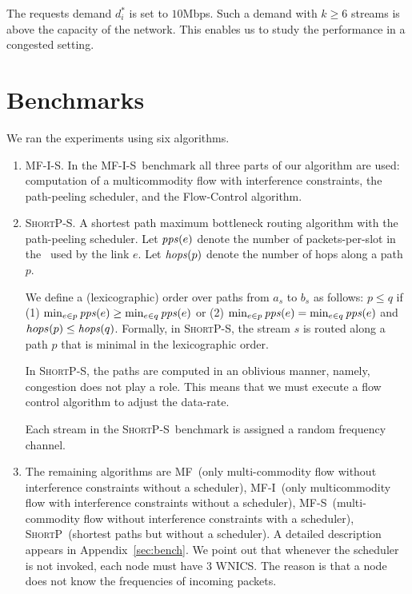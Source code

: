 \documentclass[12pt,oneside,english,a4paper]{book}
\theoremstyle{plain}
\theoremstyle{definition}
\theoremstyle{Theorem}
\theoremstyle{plain}
\newenvironment{proof sketch}[1]{\noindent {\emph{Proof sketch of #1:}}}{\hfill \qed}
\newcommand{\pps}{\text{\emph{pps}}}
\newcommand{\hops}{\text{\emph{hops}}}
\newcommand{\MCS}{\text{\sc{mcs}}}
\newcommand{\algA}{\textsc{MF-I-S}}
\newcommand{\algB}{\textsc{ShortP}}
\newcommand{\algBS}{\textsc{ShortP-S}}
\newcommand{\algC}{\textsc{MF-I}}
\newcommand{\algD}{\textsc{MF}}
\newcommand{\algE}{\textsc{MF-S}}
\begin{document}
The requests demand $d^*_i$ is set to $10$Mbps. Such a demand with
$k\geq 6$ streams is above the capacity of the network. This enables
us to study the performance in a congested setting.


\section{Benchmarks}
We ran the experiments using six algorithms.
\begin{enumerate}
\item \algA. In the \algA\ benchmark all three parts of our algorithm
  are used: computation of a multicommodity flow with interference
  constraints, the path-peeling scheduler, and the Flow-Control
  algorithm.

\item \algBS. A shortest path maximum bottleneck routing algorithm
  with the path-peeling scheduler.  Let $\pps(e)$ denote the number of
  packets-per-slot in the \MCS\ used by the link $e$.  Let $\hops(p)$
  denote the number of hops along a path $p$.

  We define a (lexicographic) order over paths from $a_s$ to $b_s$ as
  follows: $p \leq q$ if (1) $\min_{e\in p} \pps(e) \geq \min_{e\in q}
  \pps(e)$ or (2) $\min_{e \in p} \pps(e) = \min_{e \in q} \pps(e)$
  and $hops(p) \leq \hops(q)$.  Formally, in \algBS, the stream $s$ is
  routed along a path $p$ that is minimal in the lexicographic order.

  In \algBS, the paths are computed in an oblivious manner, namely,
  congestion does not play a role. This means that we must execute a
  flow control algorithm to adjust the data-rate.

  Each stream in the \algBS\ benchmark is assigned a random
  frequency channel.
\item The remaining algorithms are \algD\ (only multi-commodity flow
  without interference constraints without a scheduler), \algC\ (only
  multicommodity flow with interference constraints without a
  scheduler), \algE\ (multi-commodity flow without interference
  constraints with a scheduler), \algB\ (shortest paths but without a
  scheduler).  A detailed description appears in
  Appendix~\ref{sec:bench}. We point out that whenever the scheduler
  is not invoked, each node must have $3$ WNICS. The reason is that a
  node does not know the frequencies of incoming packets.
\end{enumerate}
\end{document}
